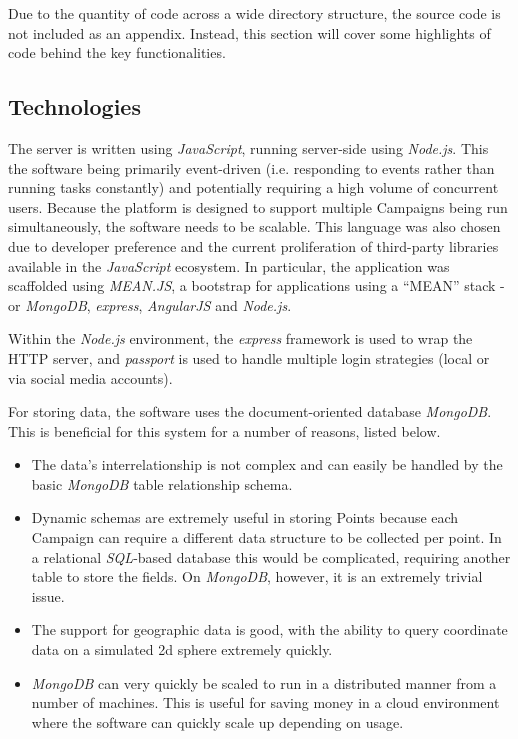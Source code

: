 \documentclass{article}
\begin{document}
		Due to the quantity of code across a wide directory structure, the source code is not included as an appendix. Instead, this section will cover some highlights of code behind the key functionalities.

		\subsection{Technologies}

		The server is written using \emph{JavaScript}, running server-side using \emph{Node.js}. This the software being primarily event-driven (i.e. responding to events rather than running tasks constantly) and potentially requiring a high volume of concurrent users\cite{tilkov_node.js:_2010}. Because the platform is designed to support multiple Campaigns being run simultaneously, the software needs to be scalable. This language was also chosen due to developer preference and the current proliferation of third-party libraries available in the \emph{JavaScript} ecosystem. In particular, the application was scaffolded using \emph{MEAN.JS}, a bootstrap for applications using a ``MEAN'' stack - or \emph{MongoDB}, \emph{express}, \emph{AngularJS} and \emph{Node.js}.

		Within the \emph{Node.js} environment, the \emph{express} framework is used to wrap the HTTP server, and \emph{passport} is used to handle multiple login strategies (local or via social media accounts).

		For storing data, the software uses the document-oriented database \emph{MongoDB}. This is beneficial for this system for a number of reasons, listed below.

		\begin{itemize}
			\item The data's interrelationship is not complex and can easily be handled by the basic \emph{MongoDB} table relationship schema.
			\item Dynamic schemas are extremely useful in storing Points because each Campaign can require a different data structure to be collected per point. In a relational \emph{SQL}-based database this would be complicated, requiring another table to store the fields. On \emph{MongoDB}, however, it is an extremely trivial issue.
			\item The support for geographic data is good, with the ability to query coordinate data on a simulated 2d sphere extremely quickly.
			\item \emph{MongoDB} can very quickly be scaled to run in a distributed manner from a number of machines. This is useful for saving money in a cloud environment where the software can quickly scale up depending on usage.
		\end{itemize}
\end{document}
